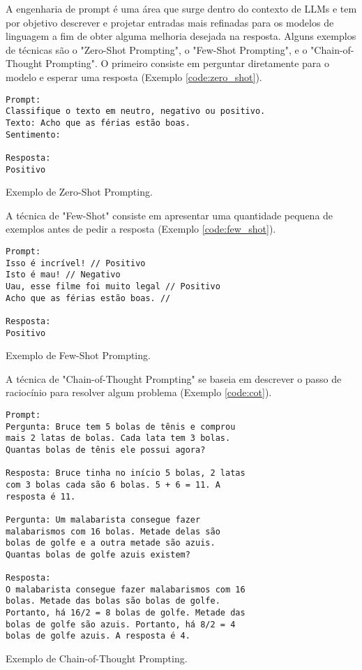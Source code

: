 \documentclass[brazilian, spanish, english]{RBIEarticle}
\begin{document}
A engenharia de prompt é uma área que surge dentro do contexto de LLMs e tem por objetivo descrever e projetar entradas mais refinadas para os modelos de linguagem a fim de obter alguma melhoria desejada na resposta. Alguns exemplos de técnicas são o "Zero-Shot Prompting", o "Few-Shot Prompting", e o "Chain-of-Thought Prompting". O primeiro consiste em perguntar diretamente para o modelo e esperar uma resposta (Exemplo \ref{code:zero_shot}).

\begin{code}[H]
\begin{verbatim}
Prompt:
Classifique o texto em neutro, negativo ou positivo.
Texto: Acho que as férias estão boas.
Sentimento:

Resposta:
Positivo
\end{verbatim}
\caption{Exemplo de Zero-Shot Prompting.}
\label{code:zero_shot}
\end{code}

A técnica de "Few-Shot" consiste em apresentar uma quantidade pequena de exemplos antes de pedir a resposta (Exemplo \ref{code:few_shot}).

\begin{code}[H]
\begin{verbatim}
Prompt:
Isso é incrível! // Positivo
Isto é mau! // Negativo
Uau, esse filme foi muito legal // Positivo
Acho que as férias estão boas. //

Resposta:
Positivo
\end{verbatim}
\caption{Exemplo de Few-Shot Prompting.}
\label{code:few_shot}
\end{code}

A técnica de "Chain-of-Thought Prompting" se baseia em descrever o passo de raciocínio para resolver algum problema (Exemplo \ref{code:cot}).

\begin{code}[H]
\begin{verbatim}
Prompt:
Pergunta: Bruce tem 5 bolas de tênis e comprou
mais 2 latas de bolas. Cada lata tem 3 bolas.
Quantas bolas de tênis ele possui agora?

Resposta: Bruce tinha no início 5 bolas, 2 latas
com 3 bolas cada são 6 bolas. 5 + 6 = 11. A
resposta é 11.

Pergunta: Um malabarista consegue fazer
malabarismos com 16 bolas. Metade delas são
bolas de golfe e a outra metade são azuis.
Quantas bolas de golfe azuis existem?

Resposta:
O malabarista consegue fazer malabarismos com 16
bolas. Metade das bolas são bolas de golfe.
Portanto, há 16/2 = 8 bolas de golfe. Metade das
bolas de golfe são azuis. Portanto, há 8/2 = 4
bolas de golfe azuis. A resposta é 4.
\end{verbatim}
\caption{Exemplo de Chain-of-Thought Prompting.}
\label{code:cot}
\end{code}
\end{document}

